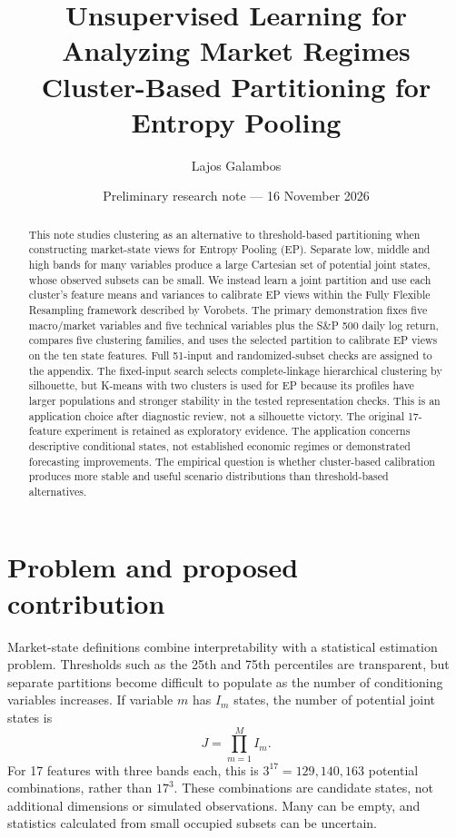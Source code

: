 \documentclass[11pt,a4paper]{article}
\title{Unsupervised Learning for Analyzing Market Regimes\\[0.4em]
\large Cluster-Based Partitioning for Entropy Pooling}
\author{Lajos Galambos}
\date{Preliminary research note --- 16 November 2026}
\begin{document}
\maketitle

\begin{abstract}
This note studies clustering as an alternative to threshold-based partitioning when constructing market-state views for Entropy Pooling (EP). Separate low, middle and high bands for many variables produce a large Cartesian set of potential joint states, whose observed subsets can be small. We instead learn a joint partition and use each cluster's feature means and variances to calibrate EP views within the Fully Flexible Resampling framework described by Vorobets. The primary demonstration fixes five macro/market variables and five technical variables plus the S\&P 500 daily log return, compares five clustering families, and uses the selected partition to calibrate EP views on the ten state features. Full 51-input and randomized-subset checks are assigned to the appendix. The fixed-input search selects complete-linkage hierarchical clustering by silhouette, but K-means with two clusters is used for EP because its profiles have larger populations and stronger stability in the tested representation checks. This is an application choice after diagnostic review, not a silhouette victory. The original 17-feature experiment is retained as exploratory evidence. The application concerns descriptive conditional states, not established economic regimes or demonstrated forecasting improvements. The empirical question is whether cluster-based calibration produces more stable and useful scenario distributions than threshold-based alternatives.
\end{abstract}

\section{Problem and proposed contribution}

Market-state definitions combine interpretability with a statistical estimation problem. Thresholds such as the 25th and 75th percentiles are transparent, but separate partitions become difficult to populate as the number of conditioning variables increases. If variable \(m\) has \(I_m\) states, the number of potential joint states is
\begin{equation}
J=\prod_{m=1}^{M} I_m.
\end{equation}
For 17 features with three bands each, this is \(3^{17}=129{,}140{,}163\) potential combinations, rather than \(17^3\). These combinations are candidate states, not additional dimensions or simulated observations. Many can be empty, and statistics calculated from small occupied subsets can be uncertain.
\end{document}
